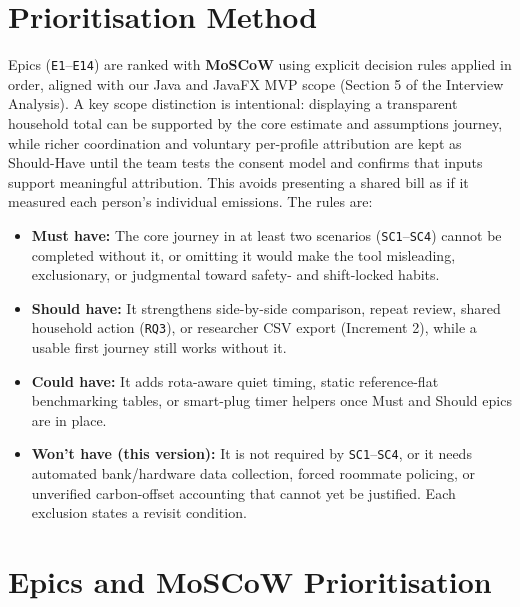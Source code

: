 \documentclass[12pt, a4paper]{article}
\begin{document}
\section{Prioritisation Method}
Epics (\texttt{E1}--\texttt{E14}) are ranked with \textbf{MoSCoW} using explicit decision rules applied in order, aligned with our Java and JavaFX MVP scope (Section 5 of the Interview Analysis). A key scope distinction is intentional: displaying a transparent household total can be supported by the core estimate and assumptions journey, while richer coordination and voluntary per-profile attribution are kept as Should-Have until the team tests the consent model and confirms that inputs support meaningful attribution. This avoids presenting a shared bill as if it measured each person’s individual emissions. The rules are:
\begin{itemize}
    \item \textbf{Must have:} The core journey in at least two scenarios (\texttt{SC1}--\texttt{SC4}) cannot be completed without it, or omitting it would make the tool misleading, exclusionary, or judgmental toward safety- and shift-locked habits.
    \item \textbf{Should have:} It strengthens side-by-side comparison, repeat review, shared household action (\texttt{RQ3}), or researcher CSV export (Increment 2), while a usable first journey still works without it.
    \item \textbf{Could have:} It adds rota-aware quiet timing, static reference-flat benchmarking tables, or smart-plug timer helpers once Must and Should epics are in place.
    \item \textbf{Won't have (this version):} It is not required by \texttt{SC1}--\texttt{SC4}, or it needs automated bank/hardware data collection, forced roommate policing, or unverified carbon-offset accounting that cannot yet be justified. Each exclusion states a revisit condition.
\end{itemize}

\section{Epics and MoSCoW Prioritisation}
\end{document}
